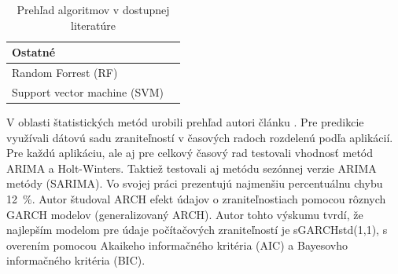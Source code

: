 \documentclass[thesismargins, thesislinespacing, openright, upjsfrontpage, combineabstracts]{rnthesis}
\begin{document}
\begin{table}[]
\begin{tabular}{ | p{7cm} | p{7cm} | }
         \hline \multicolumn{2}{l}{\textbf{Ostatné}} \\
         \hline Random Forrest (RF) & \cite{liu2015cloudy} \\
         \hline Support vector machine (SVM) & \cite{liu2015cloudy,hasegawa2001applications,Leau2015,pokhrel2017cybersecurity} \\
         
         
        
         \hline
    \end{tabular}
    \caption{Prehľad algoritmov v dostupnej literatúre}
    \label{tab:c2_alg}
\end{table}

V oblasti štatistických metód urobili prehľad autori článku \cite{roumani2015time}. Pre predikcie využívali dátovú sadu zraniteľností v časových radoch rozdelenú podľa aplikácií. Pre každú aplikáciu, ale aj pre celkový časový rad testovali vhodnosť metód ARIMA a Holt-Winters. Taktiež testovali aj metódu sezónnej verzie ARIMA metódy (SARIMA). Vo svojej práci prezentujú najmenšiu percentuálnu chybu 12~\%. Autor \cite{tang2018disclosure} študoval ARCH efekt údajov o zraniteľnostiach pomocou rôznych GARCH modelov (generalizovaný ARCH). Autor tohto výskumu tvrdí, že najlepším modelom pre údaje počítačových zraniteľností je sGARCHstd(1,1), s overením pomocou Akaikeho informačného kritéria (AIC) a Bayesovho informačného kritéria (BIC).
\end{document}
